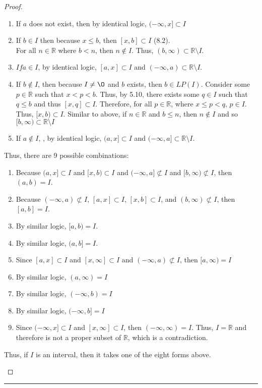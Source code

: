 \documentclass[openany, amssymb, psamsfonts]{amsart}
\newcommand{\bbR}{\mathbb{R}}
\renewcommand{\emptyset}{\O}
\newcommand{\sm}{\setminus}
\theoremstyle{definition}
\numberwithin{equation}{section}
\begin{document}
\begin{proof}
\begin{enumerate}
\begin{enumerate}
\item If $a$ does not exist, then by identical logic, $(-\infty, x]\subset I$
\item If $b\in I$ then because $x\leq b$, then $[x,b]\subset I$ (8.2). \\For all $n\in \bbR$ where $b<n$, then $n\notin I$. Thus, $(b,\infty) \subset \bbR \sm I$.
\item $If a \in I$, by identical logic, $[a,x]\subset I$ and $(-\infty, a) \subset \bbR \sm I$.
\item If $b\notin I$, then because $I \neq \emptyset$ and $b$ exists, then $b \in LP(I)$. Consider some $p\in \bbR$ such that $x<p< b$. Thus, by 5.10, there exists some $q\in I$ such that $q\leq b$ and thus $[x,q] \subset I$. Therefore, for all $p\in \bbR$, where $x\leq p < q$, $p\in I$. Thus, $[x,b)\subset I$. Similar to above, if $n\in \bbR$ and $b\leq n$, then $n\notin I$ and so $[b,\infty)\subset \bbR\sm I$
\item If $a\notin I$, , by identical logic, $(a,x]\subset I$ and $(-\infty, a] \subset \bbR \sm I$. 
\end{enumerate}
Thus, there are 9 possible combinations: 
\begin{enumerate}
\item Because $(a,x] \subset I$ and $[x,b)\subset I$ and $(-\infty,a]\not\subset I$ and $[b,\infty)\not\subset I$, then $(a,b)= I$.
\item Because $(-\infty, a)\not\subset I$, $[a,x]\subset I$, $[x,b]\subset I$, and $(b,\infty) \not\subset I$, then $[a,b]= I$.
\item By similar logic, $[a,b)= I$.
\item By similar logic, $(a,b]= I$.
\item Since $[a,x]\subset I$ and $[x,\infty]\subset I$ and $(-\infty, a)\not\subset I$, then $[a,\infty)= I$
\item By similar logic, $(a,\infty) = I$
\item By similar logic, $(-\infty, b)= I$
\item By similar logic, $(-\infty, b]= I$
\item Since $(-\infty, x]\subset I$ and $[x,\infty] \subset I$, then $(-\infty, \infty )= I$. Thus, $I = \bbR$ and therefore is not a proper subset of $\bbR$, which is a contradiction. 
\end{enumerate}
Thus, if $I$ is an interval, then it takes one of the eight forms above.
\end{enumerate}
\end{proof} \vspace{4pt}     \hrule   \vspace{4pt}
\end{document}
